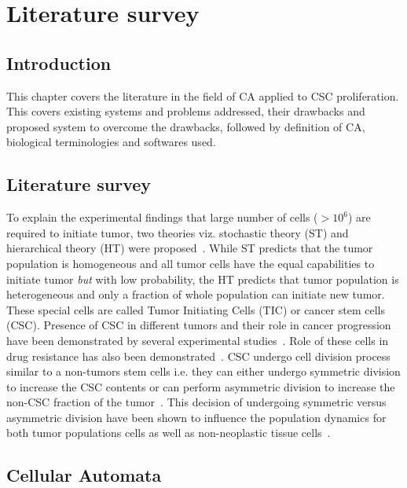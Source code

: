 \chapter{Literature survey}

\section{Introduction}
This chapter covers the literature in the field of CA applied to CSC proliferation.
This covers existing systems and problems addressed, their drawbacks and proposed system to overcome the drawbacks, 
followed by definition of CA, biological terminologies and softwares used.

\section{Literature survey}

To explain the experimental findings that large number of cells ($> 10^6$) are required to initiate tumor, two theories viz. 
stochastic theory (ST) and hierarchical theory (HT) were proposed~\cite{southam1961, reya2001, dick2003, schatton2008}. 
While ST predicts that the tumor population is homogeneous and all tumor cells have the equal capabilities to initiate tumor \textit{but} with low probability, 
the HT predicts that tumor population is heterogeneous and only a fraction of whole population can initiate new tumor. 
These special cells are called Tumor Initiating Cells (TIC) or cancer stem cells (CSC).  
Presence of CSC in different tumors and their role in cancer progression have been demonstrated by several experimental studies~\cite{al2003, al2004, singh2004, singh2003, kondo2004, setoguchi2004}. 
Role of these cells in drug resistance has also been demonstrated~\cite{dean2005, donnenberg2005}. 
CSC undergo cell division process similar to a non-tumors stem cells i.e.  they can either undergo symmetric division to increase the CSC contents or can perform asymmetric division to increase the non-CSC fraction of the tumor~\cite{Scott2014, poleszczuk2015}. 
This decision of undergoing symmetric versus asymmetric division have been shown to influence the population dynamics for both tumor populations cells as well as non-neoplastic tissue cells~\cite{morrison2006}.


\section{Cellular Automata}

